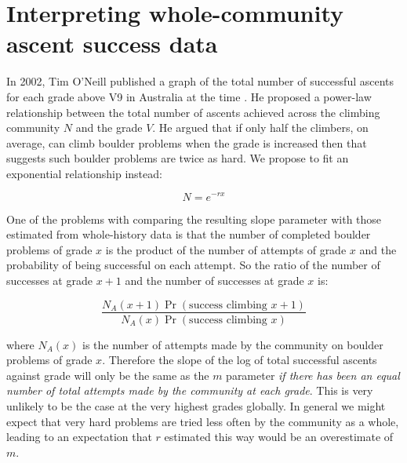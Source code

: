 \documentclass[11pt]{article}
\begin{document}
\section{Interpreting whole-community ascent success data}

In 2002, Tim O'Neill published a graph of the total number of successful ascents for each grade above V9 in Australia at the time \cite{oneill2002}. He proposed a power-law relationship between the total number of ascents achieved across the climbing community $N$ and the grade $V$. He argued that if only half the climbers, on average, can climb boulder problems when the grade is increased then that suggests such boulder problems are twice as hard. We propose to fit an exponential relationship instead:

\begin{equation}
N = e^{-rx} 
\end{equation}

One of the problems with comparing the resulting slope parameter with those estimated from whole-history data is that the number of completed boulder problems of grade $x$ is the product of the number of attempts of grade $x$ and the probability of being successful on each attempt. So the ratio of the number of successes at grade $x+1$ and the number of successes at grade $x$ is:

\begin{equation}
\frac{N_A(x+1)\Pr(\textrm{success climbing } x+1 )}{N_A(x)\Pr(\textrm{success climbing } x)}
\end{equation}

where $N_A(x)$ is the number of attempts made by the community on boulder problems of grade $x$. 
Therefore the slope of the log of total successful ascents against grade will only be the same as the $m$ parameter {\it if there has been an equal number of total attempts made by the community at each grade}. This is very unlikely to be the case at the very highest grades globally. In general we might expect that very hard problems are tried less often by the community as a whole, leading to an expectation that $r$ estimated this way would be an overestimate of $m$.
\end{document}
